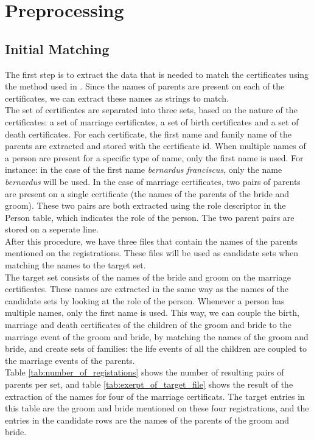 \section{Preprocessing}
\subsection{Initial Matching}
The first step is to extract the data that is needed to match the certificates using the method used in \cite{Aspects001}. Since the names of parents are present on each of the certificates, we can extract these names as strings to match.\\

The set of certificates are separated into three sets, based on the nature of the certificates: a set of marriage certificates, a set of birth certificates and a set of death certificates. For each certificate, the first name and family name of the parents are extracted and stored with the certificate id. When multiple names of a person are present for a specific type of name, only the first name is used. For instance: in the case of the first name \textit{bernardus franciscus}, only the name \textit{bernardus} will be used. 
In the case of marriage certificates, two pairs of parents are present on a single certificate (the names of the parents of the bride and groom). These two pairs are both extracted using the role descriptor in the Person table, which indicates the role of the person. The two parent pairs are stored on a seperate line.\\
After this procedure, we have three files that contain the names of the parents mentioned on the registrations. These files will be used as candidate sets when matching the names to the target set.\\

The target set consists of the names of the bride and groom on the marriage certificates. These names are extracted in the same way as the names of the candidate sets by looking at the role of the person. Whenever a person has multiple names, only the first name is used. 
This way, we can couple the birth, marriage and death certificates of the children of the groom and bride to the marriage event of the groom and bride, by matching the names of the groom and bride, and create sets of families: the life events of all the children are coupled to the marriage events of the parents. \\

Table \ref{tab:number_of_registations} shows the number of resulting pairs of parents per set, and table \ref{tab:exerpt_of_target_file} shows the result of the extraction of the names for four of the marriage certificats. The target entries in this table are the groom and bride mentioned on these four registrations, and the entries in the candidate rows are the names of the parents of the groom and bride. \\

